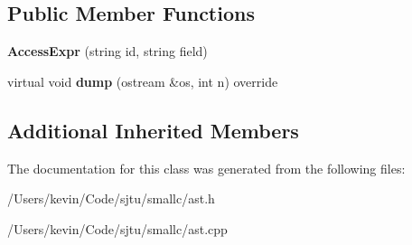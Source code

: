 \subsection*{Public Member Functions}
\begin{DoxyCompactItemize}
\item 
\mbox{\label{class_access_expr_a4b059ca805ab7937cfa02ecf8dd7febb}} 
{\bfseries Access\+Expr} (string id, string field)
\item 
\mbox{\label{class_access_expr_ae8aeb875cadfe58b833e10eda285019f}} 
virtual void {\bfseries dump} (ostream \&os, int n) override
\end{DoxyCompactItemize}
\subsection*{Additional Inherited Members}


The documentation for this class was generated from the following files\+:\begin{DoxyCompactItemize}
\item 
/\+Users/kevin/\+Code/sjtu/smallc/ast.\+h\item 
/\+Users/kevin/\+Code/sjtu/smallc/ast.\+cpp\end{DoxyCompactItemize}
